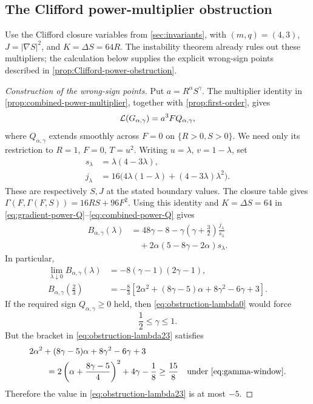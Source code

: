 \subsection{The Clifford power-multiplier obstruction}
\label{app:Clifford-power-obstruction}

Use the Clifford closure variables from \cref{sec:invariants}, with
\((m,q)=(4,3)\), \(J=|\nabla S|^2\), and \(K=\Delta S=64R\).
The instability theorem already rules out these multipliers;
the calculation below supplies the explicit wrong-sign points described
in \cref{prop:Clifford-power-obstruction}.

\begin{proof}[Construction of the wrong-sign points]
Put \(a=R^\alpha S^\gamma\). The multiplier identity in
\cref{prop:combined-power-multiplier}, together with
\cref{prop:first-order}, gives
\[
 \mathcal L(G_{\alpha,\gamma})=a^3FQ_{\alpha,\gamma},
\]
where \(Q_{\alpha,\gamma}\) extends smoothly across \(F=0\) on
\(\{R>0,S>0\}\). We need only its restriction to
\(R=1\), \(F=0\), \(T=u^2\). Writing \(u=\lambda\),
\(v=1-\lambda\), set
\[
 \begin{aligned}
 s_\lambda&=\lambda(4-3\lambda),\\
 j_\lambda&=16\bigl(4\lambda(1-\lambda)
                      +(4-3\lambda)\lambda^2\bigr).
 \end{aligned}
\]
These are respectively \(S,J\) at the stated boundary values.
The closure table gives
\(\Gamma(F,\Gamma(F,S))=16RS+96F^2\).
Using this identity and \(K=\Delta S=64\) in
\eqref{eq:gradient-power-Q}--\eqref{eq:combined-power-Q} gives
\begin{equation}\label{eq:Clifford-boundary-coefficient}
 \begin{aligned}
 B_{\alpha,\gamma}(\lambda)
 &=48\gamma-8-\gamma(\gamma+\tfrac32)\frac{j_\lambda}{s_\lambda}\\
 &\quad+2\alpha(5-8\gamma-2\alpha)s_\lambda.
 \end{aligned}
\end{equation}
In particular,
\begin{align}
 \lim_{\lambda\downarrow0}B_{\alpha,\gamma}(\lambda)
 &=-8(\gamma-1)(2\gamma-1),
 \label{eq:obstruction-lambda0}\\
 B_{\alpha,\gamma}\left(\frac23\right)
 &=-\frac83\left[
 2\alpha^2+(8\gamma-5)\alpha+8\gamma^2-6\gamma+3
 \right].
 \label{eq:obstruction-lambda23}
\end{align}
If the required sign \(Q_{\alpha,\gamma}\geq0\) held, then
\eqref{eq:obstruction-lambda0} would force
\begin{equation}\label{eq:gamma-window}
 \frac12\leq\gamma\leq1.
\end{equation}
But the bracket in \eqref{eq:obstruction-lambda23} satisfies
\begin{align}
 &2\alpha^2+(8\gamma-5)\alpha+8\gamma^2-6\gamma+3\notag\\
 &\qquad
 =2\left(\alpha+\frac{8\gamma-5}{4}\right)^2
  +4\gamma-\frac18
 \geq\frac{15}{8}
 \quad\text{under \eqref{eq:gamma-window}}.
 \label{eq:obstruction-square}
\end{align}
Therefore the value in \eqref{eq:obstruction-lambda23} is at most
$-5$.


\end{proof}
